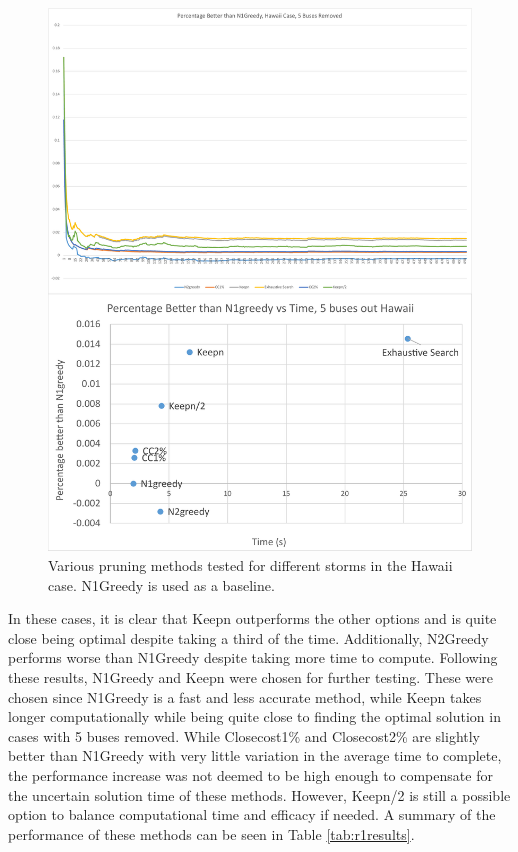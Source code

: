 \documentclass[12pt]{article}
\begin{document}
\begin{figure}[ht]
    \centering %
    \includegraphics[scale = 0.24]{Hawaii5busr1.pdf}
    \caption[Initial Testing - 5 buses removed, Hawaii Case]{Various pruning methods tested for different storms in the Hawaii case. N1Greedy is used as a baseline.}
    \label{fig:Hawaii5busr1}
\end{figure}
In these cases, it is clear that Keepn outperforms the other options and is quite close being optimal despite taking a third of the time. Additionally, N2Greedy performs worse than N1Greedy despite taking more time to compute. Following these results, N1Greedy and Keepn were chosen for further testing. These were chosen since N1Greedy is a fast and less accurate method, while Keepn takes longer computationally while being quite close to finding the optimal solution in cases with 5 buses removed. While Closecost1\% and Closecost2\% are slightly better than N1Greedy with very little variation in the average time to complete, the performance increase was not deemed to be high enough to compensate for the uncertain solution time of these methods. However, Keepn/2 is still a possible option to balance computational time and efficacy if needed. A summary of the performance of these methods can be seen in Table \ref{tab:r1results}. \par
\end{document}
